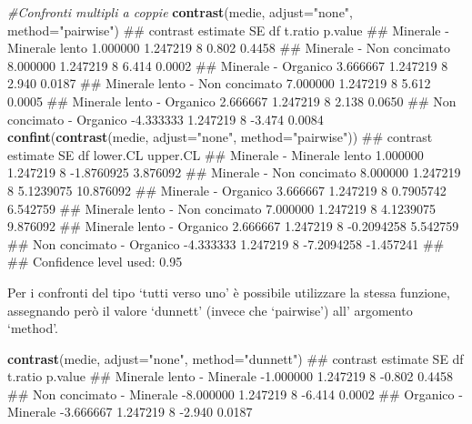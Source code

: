 \documentclass[a4paper,12pt,oneside]{book}
\newenvironment{Shaded}{\begin{snugshade}}{\end{snugshade}}
\newcommand{\KeywordTok}[1]{\textcolor[rgb]{0.13,0.29,0.53}{\textbf{#1}}}
\newcommand{\DataTypeTok}[1]{\textcolor[rgb]{0.13,0.29,0.53}{#1}}
\newcommand{\StringTok}[1]{\textcolor[rgb]{0.31,0.60,0.02}{#1}}
\newcommand{\CommentTok}[1]{\textcolor[rgb]{0.56,0.35,0.01}{\textit{#1}}}
\newcommand{\NormalTok}[1]{#1}
\theoremstyle{definition}
\theoremstyle{definition}
\theoremstyle{definition}
\theoremstyle{remark}
\begin{document}
\begin{Shaded}
\begin{Highlighting}[]
\CommentTok{#Confronti multipli a coppie}
\KeywordTok{contrast}\NormalTok{(medie, }\DataTypeTok{adjust=}\StringTok{"none"}\NormalTok{, }\DataTypeTok{method=}\StringTok{"pairwise"}\NormalTok{)}
\NormalTok{##  contrast                        estimate       SE df t.ratio p.value}
\NormalTok{##  Minerale - Minerale lento       1.000000 1.247219  8   0.802  0.4458}
\NormalTok{##  Minerale - Non concimato        8.000000 1.247219  8   6.414  0.0002}
\NormalTok{##  Minerale - Organico             3.666667 1.247219  8   2.940  0.0187}
\NormalTok{##  Minerale lento - Non concimato  7.000000 1.247219  8   5.612  0.0005}
\NormalTok{##  Minerale lento - Organico       2.666667 1.247219  8   2.138  0.0650}
\NormalTok{##  Non concimato - Organico       -4.333333 1.247219  8  -3.474  0.0084}
\KeywordTok{confint}\NormalTok{(}\KeywordTok{contrast}\NormalTok{(medie, }\DataTypeTok{adjust=}\StringTok{"none"}\NormalTok{, }\DataTypeTok{method=}\StringTok{"pairwise"}\NormalTok{))}
\NormalTok{##  contrast                        estimate       SE df   lower.CL  upper.CL}
\NormalTok{##  Minerale - Minerale lento       1.000000 1.247219  8 -1.8760925  3.876092}
\NormalTok{##  Minerale - Non concimato        8.000000 1.247219  8  5.1239075 10.876092}
\NormalTok{##  Minerale - Organico             3.666667 1.247219  8  0.7905742  6.542759}
\NormalTok{##  Minerale lento - Non concimato  7.000000 1.247219  8  4.1239075  9.876092}
\NormalTok{##  Minerale lento - Organico       2.666667 1.247219  8 -0.2094258  5.542759}
\NormalTok{##  Non concimato - Organico       -4.333333 1.247219  8 -7.2094258 -1.457241}
\NormalTok{## }
\NormalTok{## Confidence level used: 0.95}
\end{Highlighting}
\end{Shaded}

\normalsize

Per i confronti del tipo `tutti verso uno' è possibile utilizzare la
stessa funzione, assegnando però il valore `dunnett' (invece che
`pairwise') all' argomento `method'.

\small

\begin{Shaded}
\begin{Highlighting}[]
\KeywordTok{contrast}\NormalTok{(medie, }\DataTypeTok{adjust=}\StringTok{"none"}\NormalTok{, }\DataTypeTok{method=}\StringTok{"dunnett"}\NormalTok{)}
\NormalTok{##  contrast                   estimate       SE df t.ratio p.value}
\NormalTok{##  Minerale lento - Minerale -1.000000 1.247219  8  -0.802  0.4458}
\NormalTok{##  Non concimato - Minerale  -8.000000 1.247219  8  -6.414  0.0002}
\NormalTok{##  Organico - Minerale       -3.666667 1.247219  8  -2.940  0.0187}
\end{Highlighting}
\end{Shaded}
\end{document}
